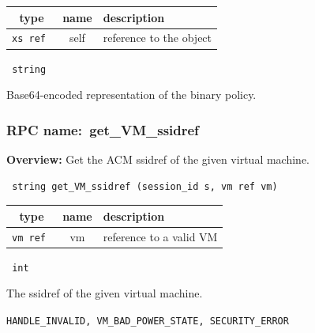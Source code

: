 

\vspace{0.3cm}
\begin{tabular}{|c|c|p{7cm}|}
 \hline
{\bf type} & {\bf name} & {\bf description} \\ \hline
{\tt xs ref } & self & reference to the object \\ \hline

\end{tabular}

\vspace{0.3cm}

{\tt
string
}


Base64-encoded representation of the binary policy.
\vspace{0.3cm}
\vspace{0.3cm}
\vspace{0.3cm}
\subsubsection{RPC name:~get\_VM\_ssidref}

{\bf Overview:}
Get the ACM ssidref of the given virtual machine.

\begin{verbatim} string get_VM_ssidref (session_id s, vm ref vm)\end{verbatim}




\vspace{0.3cm}
\begin{tabular}{|c|c|p{7cm}|}
 \hline
{\bf type} & {\bf name} & {\bf description} \\ \hline
{\tt vm ref } & vm & reference to a valid VM \\ \hline

\end{tabular}

\vspace{0.3cm}

{\tt
int
}


The ssidref of the given virtual machine.

\vspace{0.3cm}

  {\tt HANDLE\_INVALID, VM\_BAD\_POWER\_STATE, SECURITY\_ERROR}

\vspace{0.3cm}
\vspace{0.3cm}
\vspace{0.3cm}
